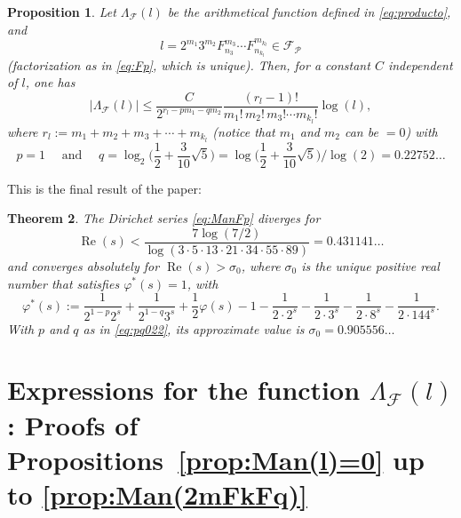 \documentclass[11pt, a4paper]{article}
\renewcommand{\Re}{\operatorname{Re}}
\newcommand{\calF}{\mathcal{F}}
\newcommand{\p}{\mathcal{P}} %
\newcommand{\manF}{\Lambda_{\mathcal{F}}}
\newcommand{\Fp}{\mathcal{F}_{\mathcal{P}}}
\theoremstyle{plain}
\newtheorem{theorem}{Theorem}
\newtheorem{proposition}[theorem]{Proposition}
\theoremstyle{definition}
\begin{document}
\begin{proposition}
\label{prop:Mcg}
Let $\manF(l)$ be the arithmetical function defined in \eqref{eq:producto},
and
\[
l = 2^{m_1}3^{m_2}F_{n_3}^{m_3} \cdots F_{n_{k_l}}^{m_{k_l}} \in \Fp
\]
(factorization as in \eqref{eq:Fp}, which is unique).
Then, for a constant $C$ independent of $l$, one has
\begin{equation}
\label{eq:Mcg}
|\manF(l)| \leq 
\frac{C}{2^{r_l-pm_1-qm_2}} \frac{(r_l-1)!}{m_1!\,m_2!\,m_3! \cdots m_{k_l}!} \log(l),
\end{equation}
where $r_{l} := m_1+m_2+m_3+ \cdots +m_{k_l}$ (notice that $m_1$ and $m_2$ can be $=0$) with
\begin{equation}
\label{eq:pq022}
p=1 \quad\text{ and }\quad 
q = \log_2 \bigg( \frac{1}{2} + \frac{3}{10} \sqrt{5} \bigg)
= \log\bigg( \frac{1}{2} + \frac{3}{10} \sqrt{5} \bigg)/\log(2) = 0.22752\dots
\end{equation}
\end{proposition}

This is the final result of the paper:

\begin{theorem}
\label{theo:sigma0}
The Dirichet series \eqref{eq:ManFp} diverges for
\begin{equation}
\label{eq:diverge}
\Re(s) < \frac{7\log(7/2)}{\log(3\cdot 5\cdot 13\cdot 21\cdot 34\cdot 55\cdot 89)} = 0.431141\dots
\end{equation}
and converges absolutely for $\Re(s) > \sigma_0$, where $\sigma_0$
is the unique positive real number that satisfies $\varphi^{*}(s)=1$, with
\[
\varphi^{*}(s) :=
\frac{1}{2^{1-p}2^s} + \frac{1}{2^{1-q}3^s} + \frac{1}{2} \varphi(s) - 1
- \frac{1}{2 \cdot 2^s} - \frac{1}{2 \cdot 3^s} - \frac{1}{2 \cdot 8^s} - \frac{1}{2 \cdot 144^s}.
\]
With $p$ and $q$ as in \eqref{eq:pq022}, its approximate value is $\sigma_0 = 0.905556\dots$
\end{theorem}

\section{Expressions for the function $\manF(l)$: Proofs of Propositions~\ref{prop:Man(l)=0} up to \ref{prop:Man(2mFkFq)}}

\end{document}
